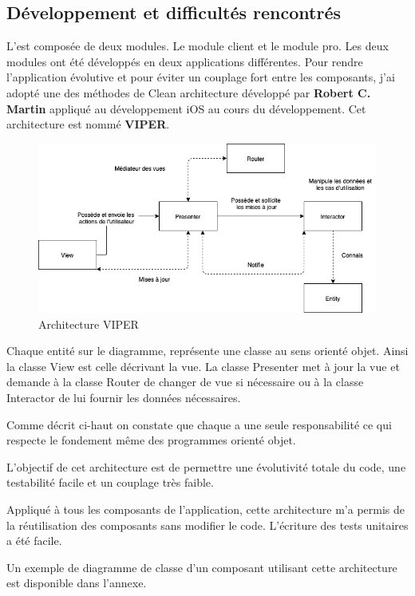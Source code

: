 \subsection{Développement et difficultés rencontrés}
L'\ar est composée de deux modules. Le module client et le module pro. Les deux modules ont été développés en deux applications différentes. Pour rendre l'application évolutive et pour éviter un couplage fort entre les composants, j'ai adopté une des méthodes de Clean architecture\cite{clean_arch} développé par \textbf{Robert C. Martin\cite{clean_code}} appliqué au développement iOS au cours du développement. Cet architecture est nommé \textbf{\gls{VIPER}\cite{viper}}.
\begin{figure}[H]
	\centering
	\includegraphics[scale=0.5]{assets/images/viper_communication_details.png}
	\caption{Architecture \gls{VIPER}}
	\label{fig.18}
\end{figure}

Chaque entité sur le diagramme, représente une classe au sens orienté objet. Ainsi la classe View est celle décrivant la vue. La classe Presenter met à jour la vue et demande à la classe Router de changer de vue si nécessaire ou à la classe Interactor de lui fournir les données nécessaires.

Comme décrit ci-haut on constate que chaque a une seule responsabilité ce qui respecte le fondement même des programmes orienté objet.

L'objectif de cet architecture est de permettre une évolutivité totale du code, une testabilité facile et un couplage très faible.

Appliqué à tous les composants de l'application, cette architecture m'a permis de la réutilisation des composants sans modifier le code. L'écriture des tests unitaires a été facile.

Un exemple de diagramme de classe d'un composant utilisant cette architecture est disponible dans l'annexe.

